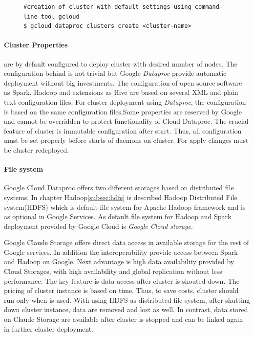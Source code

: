 \documentclass[a4paper,12pt,oneside]{report}
\begin{document}
\begin{figure}[!htbp]\lstset{extendedchars=false,escapeinside=''}
\begin{lstlisting}[style=mybash]
#creation of cluster with default settings using command-line tool gcloud
$ gcloud dataproc clusters create <cluster-name>
\end{lstlisting} \end{figure}

\paragraph{Cluster Properties} are by default configured to deploy cluster with desired 
number of nodes. The configuration behind is not trivial but Google \textit{Dataproc} provide automatic deployment without big investments. The 
configuration of open source software as Spark, Hadoop  and extensions as Hive are based on several XML and plain text configuration files. For cluster deployment 
using \textit{Dataproc}, the configuration is based on the same configuration files.Some properties are reserved by Google and cannot be overridden 
to protect functionality of Cloud Dataproc. The crucial feature of cluster is immutable configuration after start. Thus, all configuration must be set 
properly before starts of daemons on cluster. For apply changes must be cluster redeployed. 

\paragraph{File system}
Google Cloud Dataproc offers two different storages based on distributed file systems. In 
chapter Hadoop\ref{subsec:hdfs} is described Hadoop Distributed File system(HDFS) which is 
default file system for Apache Hadoop framework and is as optional in Google Services. As 
default file system for Hadoop and Spark deployment provided by Google Cloud is \textit{Google Cloud storage}. 

Google Claude Storage offers direct data access in available storage for the rest of Google 
services. In addition the interoperability provide access between Spark and Hadoop on Google. Next advantage is high data availability provided by Cloud
 Storages, with high availability and global replication without less performance. The key feature is data access after cluster is shouted down. The 
pricing of cluster instance is based on time. Thus, to save costs, cluster should run only when is used. With using HDFS as distributed file system, after 
shutting down cluster instance, data are removed and lost as well. In contrast, data stored on Claude Storage are available after cluster is stopped and 
can be linked again in further cluster deployment.
\end{document}

